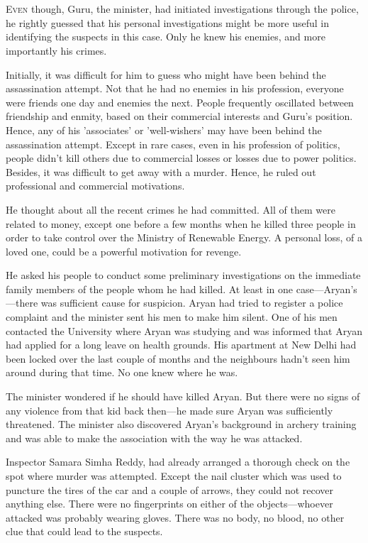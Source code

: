 \chapter{}

\lettrine{E}{ven} though, Guru, the minister, had initiated investigations through the
police, he rightly guessed that his personal investigations might be more useful
in identifying the suspects in this case. Only he knew his enemies, and more
importantly his crimes.

Initially, it was difficult for him to guess who might have been behind the
assassination attempt. Not that he had no enemies in his profession, everyone
were friends one day and enemies the next. People frequently oscillated
between friendship and enmity, based on their commercial interests and Guru's
position. Hence, any of his 'associates' or 'well-wishers' may have been behind
the assassination attempt. Except in rare cases, even in his profession
of politics, people didn't kill others due to commercial losses or losses due to
power politics. Besides, it was difficult to get away with a murder. Hence, he
ruled out professional and commercial motivations.

He thought about all the recent crimes he had committed. All of them were
related to money, except one before a few months when he killed three people in
order to take control over the Ministry of Renewable Energy. A personal loss, of
a loved one, could be a powerful motivation for revenge.

He asked his people to conduct some preliminary investigations on the immediate
family members of the people whom he had killed. At least in one
case—Aryan's—there was sufficient cause for suspicion. Aryan had tried to register
a police
complaint and the minister sent his men to make him silent. One of his men
contacted the University where Aryan was studying and was informed that Aryan
had applied for a long leave on health grounds. His apartment at New Delhi had
been locked over the last couple of months and the neighbours hadn't seen him
around during that time. No one knew where he was.

The minister wondered if he should have killed Aryan. But there were no signs of
any violence from that kid back then—he made sure Aryan was sufficiently
threatened. The minister also discovered Aryan's background in archery training
and was able to make the association with the way he was attacked.

Inspector Samara Simha Reddy, had already arranged a thorough check on the
spot where murder was attempted. Except the nail cluster which was used to
puncture the tires of the car and a couple of arrows, they could not recover
anything else. There were no fingerprints on either of the objects—whoever
attacked was probably wearing gloves. There was no body, no blood, no other clue
that could lead to the suspects.

